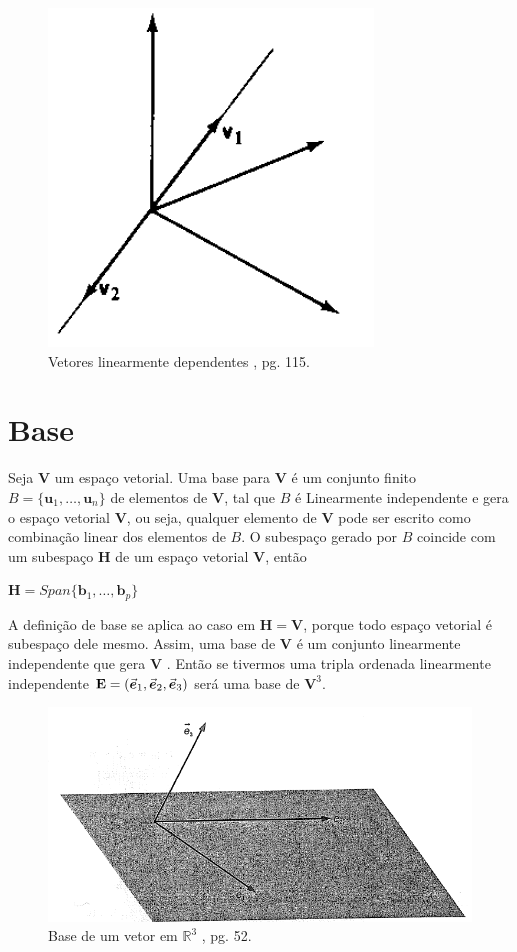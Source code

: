 \begin{figure}[H]
	\centering
	\includegraphics[scale=0.90]{cb_exemplo10.png}
	\caption{Vetores linearmente dependentes \cite{boldrini1980}, pg. 115.}
\end{figure}

\section{Base}
Seja $\mathbf{V}$ um espaço vetorial. Uma base para $\mathbf{V}$ é um conjunto finito  $B = \{\mathbf{u}_1, \ldots, \mathbf{u}_n\}$ de elementos de $\mathbf{V}$, tal que $B$ é Linearmente independente e gera o espaço vetorial $\mathbf{V}$, ou seja, qualquer elemento de $\mathbf{V}$ pode ser escrito como combinação linear dos elementos de $B$. O subespaço gerado por $B$ coincide com um subespaço $\mathbf{H}$ de um espaço vetorial $\mathbf{V}$, então

\centerline{$\mathbf{H} = Span\{\mathbf{b}_1, \ldots, \mathbf{b}_p\}$}

A definição de base se aplica ao caso em $\mathbf{H} = \mathbf{V}$, porque todo espaço vetorial é subespaço dele mesmo. Assim, uma base de $\mathbf{V}$ é um conjunto linearmente independente que gera $\mathbf{V}$ \cite{lay1999}. Então se tivermos uma tripla ordenada linearmente independente $\mathbf{E} = (\va*{e}_1, \va*{e}_2, \va*{e}_3)$ será uma base de $\mathbf{V}^3$.

\begin{figure}[H]
	\centering
	\includegraphics[scale=0.90]{b_v3.png}
	\caption{Base de um vetor em $\mathbb{R}^3$ \cite{camargo2005}, pg. 52.}
\end{figure}


